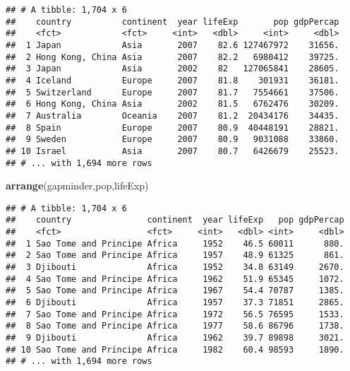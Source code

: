 \documentclass[]{article}
\newenvironment{Shaded}{\begin{snugshade}}{\end{snugshade}}
\newcommand{\KeywordTok}[1]{\textcolor[rgb]{0.13,0.29,0.53}{\textbf{#1}}}
\newcommand{\NormalTok}[1]{#1}
\newcommand{\OperatorTok}[1]{\textcolor[rgb]{0.81,0.36,0.00}{\textbf{#1}}}
\newcommand{\StringTok}[1]{\textcolor[rgb]{0.31,0.60,0.02}{#1}}
\begin{document}
\begin{verbatim}
## # A tibble: 1,704 x 6
##    country          continent  year lifeExp       pop gdpPercap
##    <fct>            <fct>     <int>   <dbl>     <int>     <dbl>
##  1 Japan            Asia       2007    82.6 127467972    31656.
##  2 Hong Kong, China Asia       2007    82.2   6980412    39725.
##  3 Japan            Asia       2002    82   127065841    28605.
##  4 Iceland          Europe     2007    81.8    301931    36181.
##  5 Switzerland      Europe     2007    81.7   7554661    37506.
##  6 Hong Kong, China Asia       2002    81.5   6762476    30209.
##  7 Australia        Oceania    2007    81.2  20434176    34435.
##  8 Spain            Europe     2007    80.9  40448191    28821.
##  9 Sweden           Europe     2007    80.9   9031088    33860.
## 10 Israel           Asia       2007    80.7   6426679    25523.
## # ... with 1,694 more rows
\end{verbatim}

\begin{Shaded}
\begin{Highlighting}[]
\KeywordTok{arrange}\NormalTok{(gapminder,pop,lifeExp)}
\end{Highlighting}
\end{Shaded}

\begin{verbatim}
## # A tibble: 1,704 x 6
##    country               continent  year lifeExp   pop gdpPercap
##    <fct>                 <fct>     <int>   <dbl> <int>     <dbl>
##  1 Sao Tome and Principe Africa     1952    46.5 60011      880.
##  2 Sao Tome and Principe Africa     1957    48.9 61325      861.
##  3 Djibouti              Africa     1952    34.8 63149     2670.
##  4 Sao Tome and Principe Africa     1962    51.9 65345     1072.
##  5 Sao Tome and Principe Africa     1967    54.4 70787     1385.
##  6 Djibouti              Africa     1957    37.3 71851     2865.
##  7 Sao Tome and Principe Africa     1972    56.5 76595     1533.
##  8 Sao Tome and Principe Africa     1977    58.6 86796     1738.
##  9 Djibouti              Africa     1962    39.7 89898     3021.
## 10 Sao Tome and Principe Africa     1982    60.4 98593     1890.
## # ... with 1,694 more rows
\end{verbatim}

\begin{Shaded}
\end{Shaded}
\end{document}
